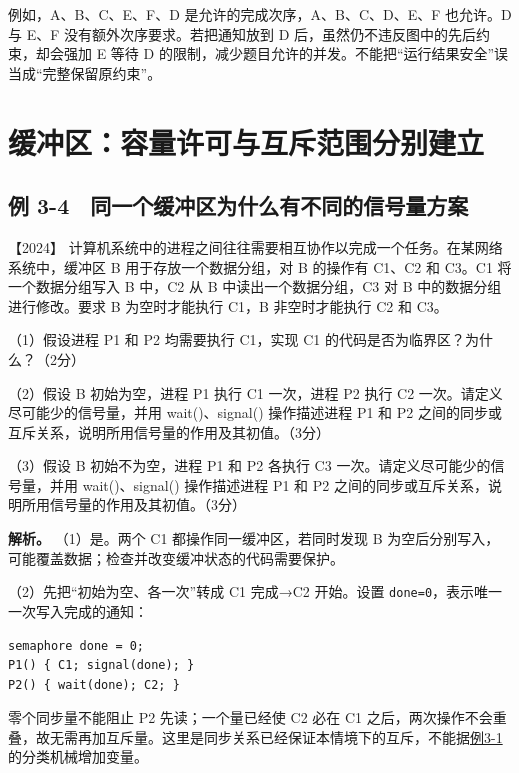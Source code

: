例如，A、B、C、E、F、D 是允许的完成次序，A、B、C、D、E、F 也允许。D 与 E、F 没有额外次序要求。若把通知放到 D 后，虽然仍不违反图中的先后约束，却会强加 E 等待 D 的限制，减少题目允许的并发。不能把``运行结果安全''误当成``完整保留原约束''。

\section{缓冲区：容量许可与互斥范围分别建立}\label{sec-buffer}

\subsection{例 3-4　同一个缓冲区为什么有不同的信号量方案}\label{ex-2024}

\noindent{}【2024】 计算机系统中的进程之间往往需要相互协作以完成一个任务。在某网络系统中，缓冲区 B 用于存放一个数据分组，对 B 的操作有 C1、C2 和 C3。C1 将一个数据分组写入 B 中，C2 从 B 中读出一个数据分组，C3 对 B 中的数据分组进行修改。要求 B 为空时才能执行 C1，B 非空时才能执行 C2 和 C3。

（1）假设进程 P1 和 P2 均需要执行 C1，实现 C1 的代码是否为临界区？为什么？（2分）

（2）假设 B 初始为空，进程 P1 执行 C1 一次，进程 P2 执行 C2 一次。请定义尽可能少的信号量，并用 wait()、signal() 操作描述进程 P1 和 P2 之间的同步或互斥关系，说明所用信号量的作用及其初值。（3分）

（3）假设 B 初始不为空，进程 P1 和 P2 各执行 C3 一次。请定义尽可能少的信号量，并用 wait()、signal() 操作描述进程 P1 和 P2 之间的同步或互斥关系，说明所用信号量的作用及其初值。（3分）


\textbf{解析。} （1）是。两个 C1 都操作同一缓冲区，若同时发现 B 为空后分别写入，可能覆盖数据；检查并改变缓冲状态的代码需要保护。

（2）先把``初始为空、各一次''转成 C1 完成→C2 开始。设置 \texttt{done=0}，表示唯一一次写入完成的通知：

\par\medskip\noindent
\begin{minipage}{\linewidth}
\begin{verbatim}
semaphore done = 0;
P1() { C1; signal(done); }
P2() { wait(done); C2; }
\end{verbatim}
\end{minipage}\par\medskip

零个同步量不能阻止 P2 先读；一个量已经使 C2 必在 C1 之后，两次操作不会重叠，故无需再加互斥量。这里是同步关系已经保证本情境下的互斥，不能据\hyperref[ex-err11]{例3-1}的分类机械增加变量。

